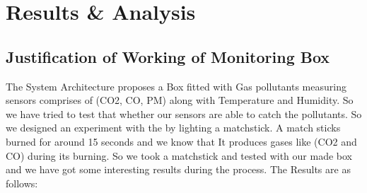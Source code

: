 \chapter{ Results \& Analysis } %

\label{Chapter4} %
 
\section{Justification of Working of Monitoring Box}

The System Architecture proposes a Box fitted with Gas pollutants measuring sensors comprises of (CO2, CO, PM) along with Temperature and Humidity. So we have tried to test that whether our sensors are able to catch the pollutants. So we designed an experiment with the by lighting a matchstick. A match sticks burned for around 15 seconds and we know that It produces gases like (CO2 and CO) during its burning. So we took a matchstick and tested with our made box and we have got some interesting results during the process. The Results are as follows:

